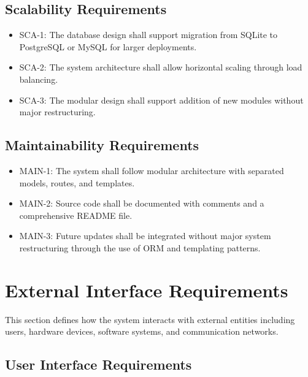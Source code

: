 \subsection{Scalability Requirements}

\begin{itemize}
\item SCA-1: The database design shall support migration from SQLite to PostgreSQL or MySQL for larger deployments.
\item SCA-2: The system architecture shall allow horizontal scaling through load balancing.
\item SCA-3: The modular design shall support addition of new modules without major restructuring.
\end{itemize}


\subsection{Maintainability Requirements}

\begin{itemize}
\item MAIN-1: The system shall follow modular architecture with separated models, routes, and templates.
\item MAIN-2: Source code shall be documented with comments and a comprehensive README file.
\item MAIN-3: Future updates shall be integrated without major system restructuring through the use of ORM and templating patterns.
\end{itemize}



\section{External Interface Requirements}

This section defines how the system interacts with external entities including 
users, hardware devices, software systems, and communication networks.


\subsection{User Interface Requirements}

